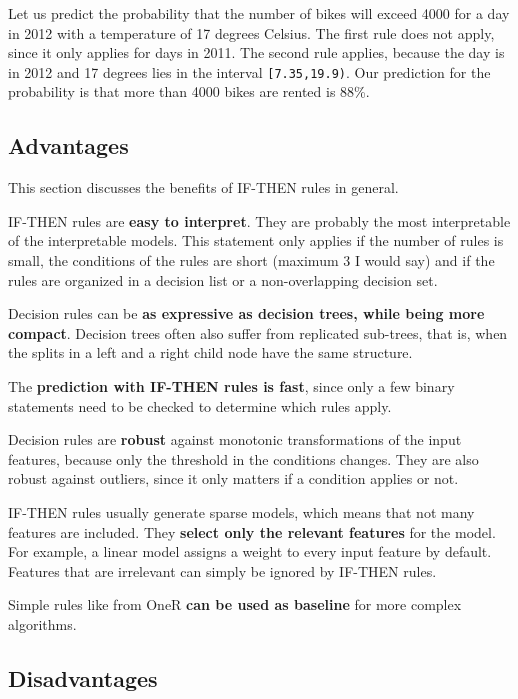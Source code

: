 \documentclass[
  10pt,
]{scrbook}
\begin{document}
Let us predict the probability that the number of bikes will exceed 4000 for a day in 2012 with a temperature of 17 degrees Celsius.
The first rule does not apply, since it only applies for days in 2011.
The second rule applies, because the day is in 2012 and 17 degrees lies in the interval \texttt{{[}7.35,19.9)}.
Our prediction for the probability is that more than 4000 bikes are rented is 88\%.

\hypertarget{advantages-3}{%
\subsection{Advantages}\label{advantages-3}}

This section discusses the benefits of IF-THEN rules in general.

IF-THEN rules are \textbf{easy to interpret}.
They are probably the most interpretable of the interpretable models.
This statement only applies if the number of rules is small, the conditions of the rules are short (maximum 3 I would say) and if the rules are organized in a decision list or a non-overlapping decision set.

Decision rules can be \textbf{as expressive as decision trees, while being more compact}.
Decision trees often also suffer from replicated sub-trees, that is, when the splits in a left and a right child node have the same structure.

The \textbf{prediction with IF-THEN rules is fast}, since only a few binary statements need to be checked to determine which rules apply.

Decision rules are \textbf{robust} against monotonic transformations of the input features, because only the threshold in the conditions changes.
They are also robust against outliers, since it only matters if a condition applies or not.

IF-THEN rules usually generate sparse models, which means that not many features are included.
They \textbf{select only the relevant features} for the model.
For example, a linear model assigns a weight to every input feature by default.
Features that are irrelevant can simply be ignored by IF-THEN rules.

Simple rules like from OneR \textbf{can be used as baseline} for more complex algorithms.

\hypertarget{disadvantages-3}{%
\subsection{Disadvantages}\label{disadvantages-3}}
\end{document}

